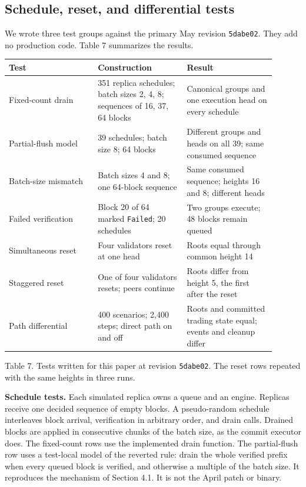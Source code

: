 \documentclass[11pt]{article}
\begin{document}
\subsection{Schedule, reset, and differential tests}
We wrote three test groups against the primary May revision \texttt{5dabe02}. They add no production code. Table 7 summarizes the results. \cite{R30}

{\small\begin{longtable}{@{}p{0.300\linewidth}p{0.300\linewidth}p{0.300\linewidth}@{}}
\toprule
Test & Construction & Result \\
\midrule
\endhead
Fixed-count drain & 351 replica schedules; batch sizes 2, 4, 8; sequences of 16, 37, 64 blocks & Canonical groups and one execution head on every schedule \\
Partial-flush model & 39 schedules; batch size 8; 64 blocks & Different groups and heads on all 39; same consumed sequence \\
Batch-size mismatch & Batch sizes 4 and 8; one 64-block sequence & Same consumed sequence; heights 16 and 8; different heads \\
Failed verification & Block 20 of 64 marked \texttt{Failed}; 20 schedules & Two groups execute; 48 blocks remain queued \\
Simultaneous reset & Four validators reset at one head & Roots equal through common height 14 \\
Staggered reset & One of four validators resets; peers continue & Roots differ from height 5, the first after the reset \\
Path differential & 400 scenarios; 2,400 steps; direct path on and off & Roots and committed trading state equal; events and cleanup differ \\
\bottomrule
\end{longtable}}
Table 7. Tests written for this paper at revision \texttt{5dabe02}. The reset rows repeated with the same heights in three runs. \cite{R30}

\textbf{Schedule tests.} Each simulated replica owns a queue and an engine. Replicas receive one decided sequence of empty blocks. A pseudo-random schedule interleaves block arrival, verification in arbitrary order, and drain calls. Drained blocks are applied in consecutive chunks of the batch size, as the commit executor does. The fixed-count rows use the implemented drain function. The partial-flush row uses a test-local model of the reverted rule: drain the whole verified prefix when every queued block is verified, and otherwise a multiple of the batch size. It reproduces the mechanism of Section 4.1. It is not the April patch or binary. \cite{R15,R30}
\end{document}
